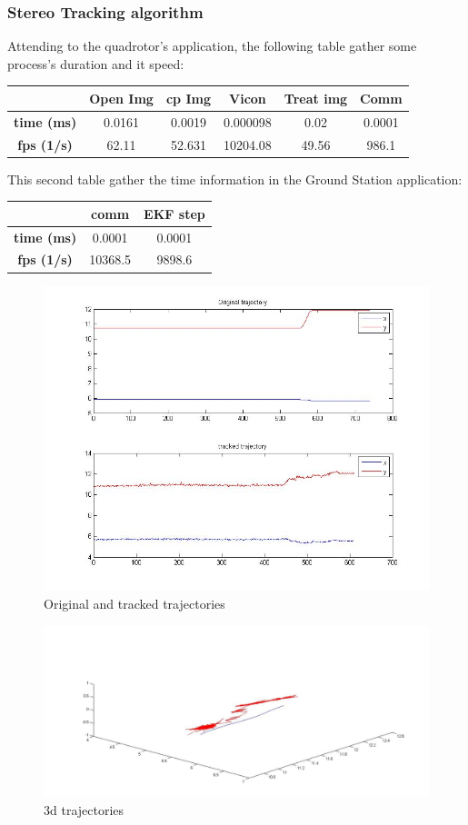 	
	\subsubsection{Stereo Tracking algorithm}
		Attending to the quadrotor's application, the following table gather some process's duration and it speed:
		\newline
		\newline
		{
		\centering
			\begin{tabular}{|c|c|c|c|c|c|}
			\hline  					&  Open Img	&  cp Img 	& Vicon 	& Treat img & Comm  		\\ 
			\hline  \textbf{time (ms)}	& 	0.0161	& 0.0019	&	0.000098&  	 0.02	&	0.0001		\\ 
			\hline  \textbf{fps (1/s)}	&  	62.11	&  52.631	& 10204.08 	&  49.56	&	986.1	\\ 
			\hline 
			\end{tabular} 
		}
		\newline
		
		This second table gather the time information in the Ground Station application:
		\newline
		
		{
		\centering
			\begin{tabular}{|c|c|c|}
			\hline  					&  comm		&  EKF step	\\
			\hline  \textbf{time (ms)}	& 	0.0001	& 	0.0001	\\
			\hline  \textbf{fps (1/s)}	&  	10368.5	&   9898.6 	\\
			\hline 
			\end{tabular} 
		}
		\newline
	\begin{figure}[ph]
		\centering
		\includegraphics[width=0.7\linewidth]{../Images/c4/arch_trajs_stero}
		\caption{Original and tracked trajectories}
		\label{fig:arch_trajs_stero}
	\end{figure}
	
	\begin{figure}[ph]
		\centering
		\includegraphics[width=0.6\linewidth]{../Images/c4/arch_3d_trajs_stero}
		\caption{3d trajectories}
		\label{fig:arch_3d_trajs_stero}
	\end{figure}
